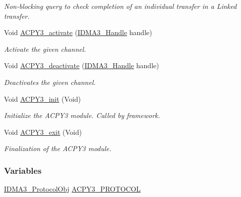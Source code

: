 \begin{CompactItemize}
\begin{CompactList}\small\item\em Non-blocking query to check completion of an individual transfer in a Linked transfer. \item\end{CompactList}\item 
Void \hyperlink{group___d_s_p_a_c_p_y3_gf9dc07965774895d79323a47b36cc442}{ACPY3\_\-activate} (\hyperlink{struct_i_d_m_a3___obj}{IDMA3\_\-Handle} handle)
\begin{CompactList}\small\item\em Activate the given channel. \item\end{CompactList}\item 
Void \hyperlink{group___d_s_p_a_c_p_y3_g2736d2e136e868577a71710571027de5}{ACPY3\_\-deactivate} (\hyperlink{struct_i_d_m_a3___obj}{IDMA3\_\-Handle} handle)
\begin{CompactList}\small\item\em Deactivates the given channel. \item\end{CompactList}\item 
Void \hyperlink{group___d_s_p_a_c_p_y3_gc79227aad8cb9f68ab67da77de81fd17}{ACPY3\_\-init} (Void)
\begin{CompactList}\small\item\em Initialize the ACPY3 module. Called by framework. \item\end{CompactList}\item 
Void \hyperlink{group___d_s_p_a_c_p_y3_ge7072f7010b53bdeab5ac76737b380af}{ACPY3\_\-exit} (Void)
\begin{CompactList}\small\item\em Finalization of the ACPY3 module. \item\end{CompactList}\end{CompactItemize}
\subsubsection*{Variables}
\begin{CompactItemize}
\item 
\hyperlink{struct_i_d_m_a3___protocol_obj}{IDMA3\_\-Protocol\-Obj} \hyperlink{group___d_s_p_a_c_p_y3_g7171d01619b7fc26dbb11eb9aaf1a3b2}{ACPY3\_\-PROTOCOL}
\end{CompactItemize}


